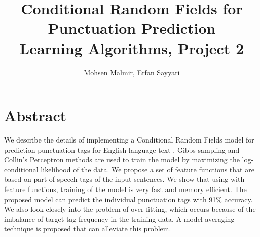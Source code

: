 \documentclass[twoside,12pt]{article}
\begin{document}
\title{ Conditional Random Fields for Punctuation Prediction\\  Learning Algorithms, Project 2}
\author{Mohsen Malmir, Erfan Sayyari}
\maketitle
\section{Abstract}
We describe the details of implementing  a Conditional Random Fields model for prediction punctuation tags for English language text . Gibbs sampling and Collin's Perceptron methods are used to train the model by maximizing the log-conditional likelihood of the data. We propose a set of feature functions that are based on part of speech tags of the input sentences. We show that using with feature functions, training of the model is very fast and memory efficient. The proposed model can predict the individual punctuation tags with 91\% accuracy. We also look closely into the problem of over fitting, which occurs because of the imbalance of target tag frequency in the training data. A model averaging technique is proposed that can alleviate this problem. 
\end{document}
